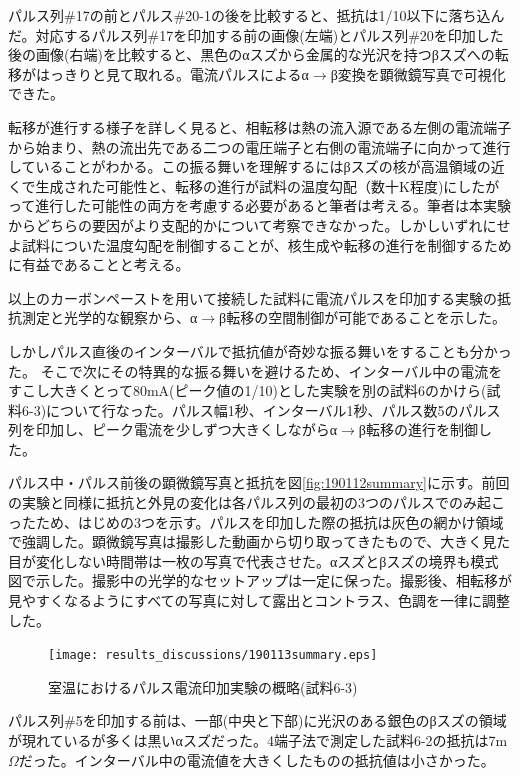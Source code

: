 パルス列\#17の前とパルス\#20-1の後を比較すると、抵抗は1/10以下に落ち込んだ。対応するパルス列\#17を印加する前の画像(左端)とパルス列\#20を印加した後の画像(右端)を比較すると、黒色のαスズから金属的な光沢を持つβスズへの転移がはっきりと見て取れる。電流パルスによるα$\to$β変換を顕微鏡写真で可視化できた。

転移が進行する様子を詳しく見ると、相転移は熱の流入源である左側の電流端子から始まり、熱の流出先である二つの電圧端子と右側の電流端子に向かって進行していることがわかる。この振る舞いを理解するにはβスズの核が高温領域の近くで生成された可能性と、転移の進行が試料の温度勾配（数十K程度)にしたがって進行した可能性の両方を考慮する必要があると筆者は考える。筆者は本実験からどちらの要因がより支配的かについて考察できなかった。しかしいずれにせよ試料についた温度勾配を制御することが、核生成や転移の進行を制御するために有益であることと考える。

以上のカーボンペーストを用いて接続した試料に電流パルスを印加する実験の抵抗測定と光学的な観察から、α$\to$β転移の空間制御が可能であることを示した。

しかしパルス直後のインターバルで抵抗値が奇妙な振る舞いをすることも分かった。
そこで次にその特異的な振る舞いを避けるため、インターバル中の電流をすこし大きくとって80mA(ピーク値の1/10)とした実験を別の試料6のかけら(試料6-3)について行なった。パルス幅1秒、インターバル1秒、パルス数5のパルス列を印加し、ピーク電流を少しずつ大きくしながらα$\to$β転移の進行を制御した。

パルス中・パルス前後の顕微鏡写真と抵抗を図\ref{fig:190112summary}に示す。前回の実験と同様に抵抗と外見の変化は各パルス列の最初の3つのパルスでのみ起こったため、はじめの3つを示す。パルスを印加した際の抵抗は灰色の網かけ領域で強調した。顕微鏡写真は撮影した動画から切り取ってきたもので、大きく見た目が変化しない時間帯は一枚の写真で代表させた。αスズとβスズの境界も模式図で示した。撮影中の光学的なセットアップは一定に保った。撮影後、相転移が見やすくなるようにすべての写真に対して露出とコントラス、色調を一律に調整した。
\begin{landscape}
\begin{figure}[!h]
    \begin{center}
   \texttt{[image: results\_discussions/190113summary.eps]}
  \end{center}
    \caption{室温におけるパルス電流印加実験の概略(試料6-3)}
  \label{fig:190113summary}
\end{figure}
\end{landscape}

パルス列\#5を印加する前は、一部(中央と下部)に光沢のある銀色のβスズの領域が現れているが多くは黒いαスズだった。4端子法で測定した試料6-2の抵抗は7m$\Omega$だった。インターバル中の電流値を大きくしたものの抵抗値は小さかった。

